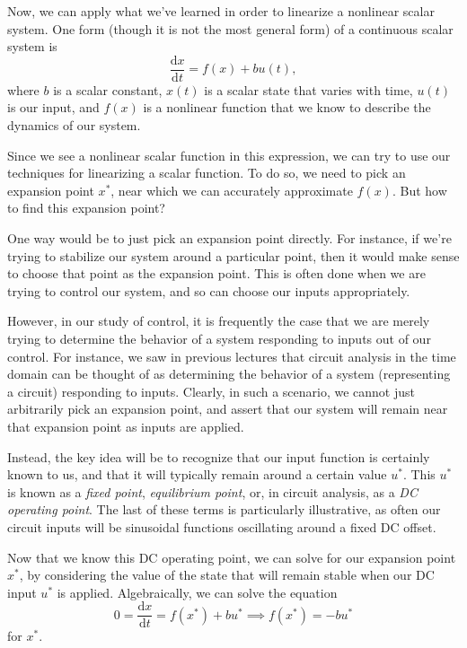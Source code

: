 \documentclass[letterpaper]{article}
\theoremstyle{remark}
\newcommand{\dx}{\mathrm{d}x}
\newcommand{\dt}{\mathrm{d}t}
\begin{document}
Now, we can apply what we've learned in order to linearize a nonlinear scalar system. One form (though it is not the most general form) of a continuous scalar system is
\[
    \frac{\dx}{\dt} = f(x) + bu(t),
\]
where $b$ is a scalar constant, $x(t)$ is a scalar state that varies with time, $u(t)$ is our input, and $f(x)$ is a nonlinear function that we know to describe the dynamics of our system.

Since we see a nonlinear scalar function in this expression, we can try to use our techniques for linearizing a scalar function. To do so, we need to pick an expansion point $x^*$, near which we can accurately approximate $f(x)$. But how to find this expansion point?

One way would be to just pick an expansion point directly. For instance, if we're trying to stabilize our system around a particular point, then it would make sense to choose that point as the expansion point. This is often done when we are trying to control our system, and so can choose our inputs appropriately. 

However, in our study of control, it is frequently the case that we are merely trying to determine the behavior of a system responding to inputs out of our control. For instance, we saw in previous lectures that circuit analysis in the time domain can be thought of as determining the behavior of a system (representing a circuit) responding to inputs. Clearly, in such a scenario, we cannot just arbitrarily pick an expansion point, and assert that our system will remain near that expansion point as inputs are applied.

Instead, the key idea will be to recognize that our input function is certainly known to us, and that it will typically remain around a certain value $u^*$. This $u^*$ is known as a \emph{fixed point}, \emph{equilibrium point}, or, in circuit analysis, as a \emph{DC operating point}. The last of these terms is particularly illustrative, as often our circuit inputs will be sinusoidal functions oscillating around a fixed DC offset.

Now that we know this DC operating point, we can solve for our expansion point $x^*$, by considering the value of the state that will remain stable when our DC input $u^*$ is applied. Algebraically, we can solve the equation
\[
    0 = \frac{\dx}{\dt} = f(x^*) + bu^* \implies f(x^*) = -bu^*
\]
for $x^*$.
\end{document}
